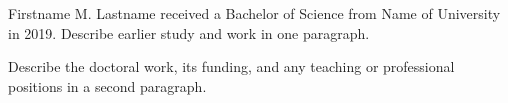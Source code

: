 Firstname M. Lastname received a Bachelor of Science from Name of University in 2019. Describe earlier study and work in one paragraph.

Describe the doctoral work, its funding, and any teaching or professional positions in a second paragraph.
